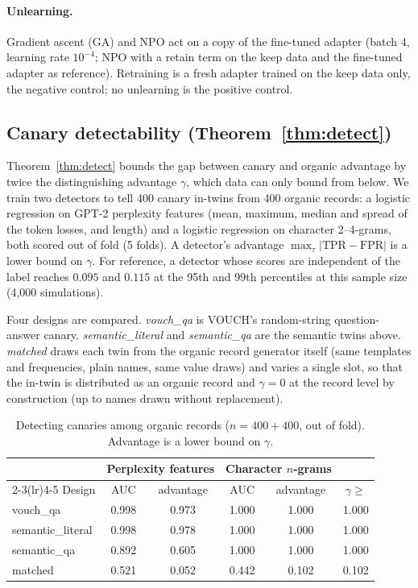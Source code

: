 \documentclass[11pt]{article}
\theoremstyle{definition}
\theoremstyle{remark}
\begin{document}
\paragraph{Unlearning.} Gradient ascent (GA) and NPO act on a copy of the fine-tuned
adapter (batch 4, learning rate $10^{-4}$; NPO with a retain term on the keep data and
the fine-tuned adapter as reference). Retraining is a fresh adapter trained on the keep
data only, the negative control; no unlearning is the positive control.

\subsection{Canary detectability (Theorem~\ref{thm:detect})}

Theorem~\ref{thm:detect} bounds the gap between canary and organic advantage by twice
the distinguishing advantage $\gamma$, which data can only bound from below. We train
two detectors to tell 400 canary in-twins from 400 organic records: a logistic
regression on GPT-2 perplexity features (mean, maximum, median and spread of the
token losses, and length) and a logistic regression on character 2--4-grams, both
scored out of fold (5 folds). A detector's advantage $\max_\tau|\mathrm{TPR}-\mathrm{FPR}|$
is a lower bound on $\gamma$. For reference, a detector whose scores are independent of
the label reaches $0.095$ and $0.115$ at the 95th and 99th percentiles at this sample
size (4{,}000 simulations).

Four designs are compared. \emph{vouch\_qa} is VOUCH's random-string question-answer
canary. \emph{semantic\_literal} and \emph{semantic\_qa} are the semantic twins above.
\emph{matched} draws each twin from the organic record generator itself (same
templates and frequencies, plain names, same value draws) and varies a single slot,
so that the in-twin is distributed as an organic record and $\gamma=0$ at the record
level by construction (up to names drawn without replacement).

\begin{table}[h]
\centering
\caption{Detecting canaries among organic records ($n=400+400$, out of fold).
Advantage is a lower bound on $\gamma$.}\label{tab:detect}
\begin{tabular}{lccccc}
\toprule
 & \multicolumn{2}{c}{Perplexity features} & \multicolumn{2}{c}{Character $n$-grams} & \\
\cmidrule(lr){2-3}\cmidrule(lr){4-5}
Design & AUC & advantage & AUC & advantage & $\gamma\ge$ \\
\midrule
vouch\_qa         & 0.998 & 0.973 & 1.000 & 1.000 & 1.000 \\
semantic\_literal & 0.998 & 0.978 & 1.000 & 1.000 & 1.000 \\
semantic\_qa      & 0.892 & 0.605 & 1.000 & 1.000 & 1.000 \\
matched           & 0.521 & 0.052 & 0.442 & 0.102 & 0.102 \\
\bottomrule
\end{tabular}
\end{table}
\end{document}
